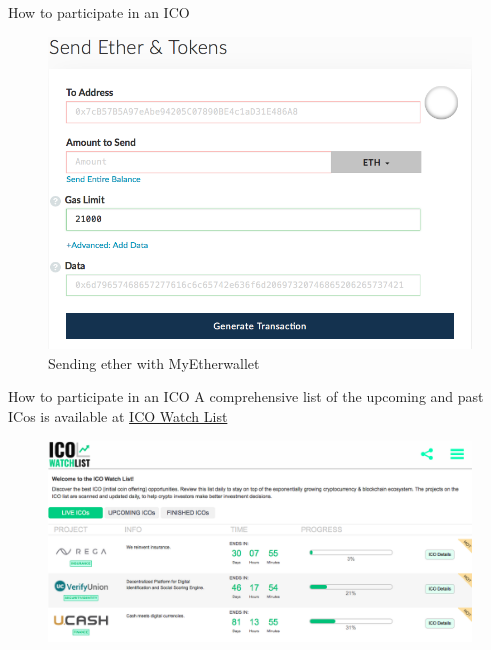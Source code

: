 \documentclass[11pt]{beamer}
\begin{document}

\begin{frame}{How to participate in an ICO}
	\begin{figure}[]
		\centering
		\includegraphics  [scale=0.3]{Images/wallet}
		\caption{Sending ether with MyEtherwallet}
	\end{figure}
\end{frame}


\begin{frame}{How to participate in an ICO}
	A comprehensive list of the upcoming and past ICos is available at \href{https://icowatchlist.com}{ICO Watch List}
	\begin{figure}[]
		\centering
		\includegraphics  [scale=0.2]{Images/ICOlist}
	\end{figure}
\end{frame}
\end{document}
